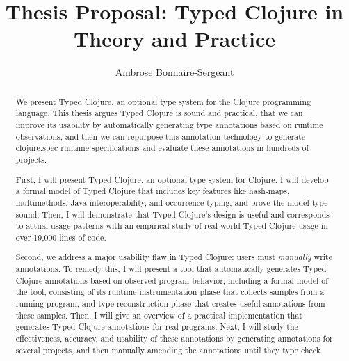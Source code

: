 \documentclass[9pt]{extarticle}
\title{Thesis Proposal: Typed Clojure in Theory and Practice}
\author{Ambrose Bonnaire-Sergeant}
\begin{document}
\maketitle

\begin{abstract}
We present Typed Clojure, an optional type system for the Clojure programming language.
This thesis argues Typed Clojure is sound and practical,
that we can improve its usability by automatically generating type annotations based on runtime observations,
and then we can repurpose this annotation technology to generate clojure.spec runtime specifications
and evaluate these annotations in hundreds of projects.

First, I will present Typed Clojure, an optional type system for Clojure.
I will develop a formal model of Typed Clojure that includes
key features like hash-maps, multimethods, Java interoperability, and occurrence typing,
and prove the model type sound.
Then, I will demonstrate that Typed Clojure's design is useful and corresponds to actual usage patterns
with an empirical study of real-world Typed Clojure usage in over 19,000 lines of code.

Second, we address a major usability flaw in Typed Clojure: users must \emph{manually}
write annotations.
To remedy this, 
I will present a tool that automatically generates Typed Clojure annotations based on observed
program behavior, including
a formal model of the tool, consisting of its runtime instrumentation phase that
collects samples from a running program, and type reconstruction phase
that creates useful annotations from these samples.
Then, I will give an overview of a practical implementation that generates Typed Clojure annotations for
real programs.
Next, I will study the effectiveness, accuracy, and usability of these annotations
by generating annotations for several projects, and then manually amending the annotations
until they type check.


\end{abstract}
\end{document}

